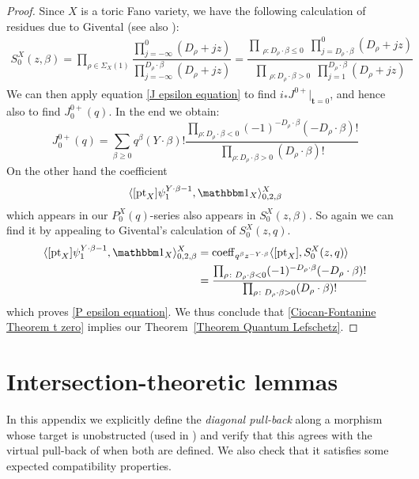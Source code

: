 \documentclass[11pt]{amsart}
\newcommand{\pt}{\operatorname{pt}}
\theoremstyle{definition}
\theoremstyle{definition}
\begin{document}
\begin{proof}
Since $X$ is a toric Fano variety, we have the following calculation of residues due to Givental \cite{Givental-mirror} (see also \cite[Definition 7.2.8]{CF-K}):
\begin{align*}
S_0^X(z,\beta) =\prod_{\rho\in\Sigma_X(1)}\dfrac{\prod_{j=-\infty}^0(D_{\rho}+jz)}{\prod_{j=-\infty}^{D_{\rho}\cdot \beta}(D_\rho+jz)}
=\dfrac{\prod_{\substack{\rho \colon D_\rho \cdot \beta\leq 0}} \prod_{j=D_\rho \cdot \beta}^0 (D_{\rho}+jz)}{\prod_{\substack{\rho\colon D_\rho \cdot\beta > 0}} \prod_{j=1}^{D_\rho\cdot\beta} (D_{\rho}+jz)}
\end{align*}
We can then apply equation \eqref{J epsilon equation} to find $i_*J^{0+}|_{\mathbf{t}=0}$, and hence also to find $J^{0+}_0(q)$. In the end we obtain:
\begin{equation*}
 J^{0+}_0(q)=\sum_{\beta\geq 0}q^\beta(Y\cdot\beta)!\frac{\prod_{\rho\colon D_\rho\cdot\beta< 0}(-1)^{-D_{\rho}\cdot\beta}(-D_{\rho}\cdot\beta)!}{\prod_{\rho\colon D_\rho\cdot\beta> 0}(D_{\rho}\cdot\beta)!}
\end{equation*}
On the other hand the coefficient
\begin{equation*} \langle[\pt_X]\psi_1^{Y\cdot\beta-1},\mathbbm 1_X\rangle_{0,2,\beta}^X\end{equation*}
which appears in our $P_0^X(q)$-series also appears in $S_0^X(z,\beta)$. So again we can find it by appealing to Givental's calculation of $S_0^X(z,q)$.
\begin{align*}
 \langle[\pt_X]\psi_1^{Y\cdot\beta-1},\mathbbm 1_X\rangle_{0,2,\beta}^X &=\operatorname{coeff}_{q^\beta z^{-Y\cdot\beta}}\langle [\pt_X],S_0^X(z,q) \rangle\\
& =\frac{\prod_{\rho\colon D_\rho\cdot\beta< 0}(-1)^{-D_{\rho}\cdot\beta}(-D_{\rho}\cdot\beta)!}{\prod_{\rho\colon D_\rho\cdot\beta> 0}(D_{\rho}\cdot\beta)!}
\end{align*}
which proves \eqref{P epsilon equation}. We thus conclude that \eqref{Ciocan-Fontanine Theorem t zero} implies our Theorem~\ref{Theorem Quantum Lefschetz}. \end{proof}

\appendix

\section{Intersection-theoretic lemmas}\label{appendix:intersection}

In this appendix we explicitly define the \emph{diagonal pull-back} along a morphism whose target is unobstructed (used in \cite{Ga}) and verify that this agrees with the virtual pull-back of \cite{Manolache-Pull} when both are defined. We also check that it satisfies some expected compatibility properties.
\end{document}
